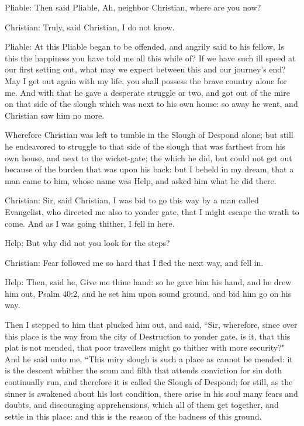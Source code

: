 Pliable: Then said Pliable, Ah, neighbor Christian, where are you now? 

Christian: Truly, said Christian, I do not know. 

Pliable: At this Pliable began to be offended, and angrily said to his fellow, Is this the happiness you have told me all this while of? If we have such ill speed at our first setting out, what may we expect between this and our journey's end? May I get out again with my life, you shall possess the brave country alone for me. And with that he gave a desperate struggle or two, and got out of the mire on that side of the slough which was next to his own house: so away he went, and Christian saw him no more. 

Wherefore Christian was left to tumble in the Slough of Despond alone; but still he endeavored to struggle to that side of the slough that was farthest from his own house, and next to the wicket-gate; the which he did, but could not get out because of the burden that was upon his back: but I beheld in my dream, that a man came to him, whose name was Help, and asked him what he did there. 

Christian: Sir, said Christian, I was bid to go this way by a man called Evangelist, who directed me also to yonder gate, that I might escape the wrath to come. And as I was going thither, I fell in here. 

Help: But why did not you look for the steps? 

Christian: Fear followed me so hard that I fled the next way, and fell in. 

Help: Then, said he, Give me thine hand: so he gave him his hand, and he drew him out, Psalm 40:2, and he set him upon sound ground, and bid him go on his way. 

Then I stepped to him that plucked him out, and said, ``Sir, wherefore, since over this place is the way from the city of Destruction to yonder gate, is it, that this plat is not mended, that poor travellers might go thither with more security?" And he said unto me, ``This miry slough is such a place as cannot be mended: it is the descent whither the scum and filth that attends conviction for sin doth continually run, and therefore it is called the Slough of Despond; for still, as the sinner is awakened about his lost condition, there arise in his soul many fears and doubts, and discouraging apprehensions, which all of them get together, and settle in this place: and this is the reason of the badness of this ground. 

